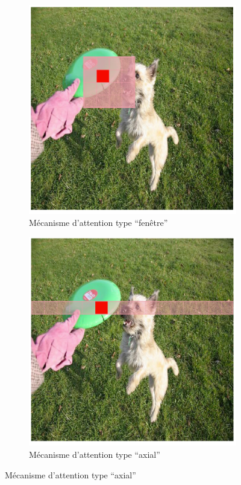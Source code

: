 \begin{figure}[H]
\begin{subfigure}[b]{0.30\textwidth}
        \includegraphics[width=\textwidth]{02-main/figures/ch2/ch2_yolo_02_attention_area_window.png}
        \caption{Mécanisme d'attention type ``fenêtre''}
        \label{fig:ch2_yolo_02_attention_area_window}
    \end{subfigure}
    \hfill
    \begin{subfigure}[b]{0.30\textwidth}
        \centering
        \includegraphics[width=\textwidth]{02-main/figures/ch2/ch2_yolo_03_attention_area_criss_axial.png}
        \caption{Mécanisme d'attention type ``axial''}
        \label{fig:ch2_yolo_03_attention_area_criss_axial}
    \end{subfigure}


\end{figure}

